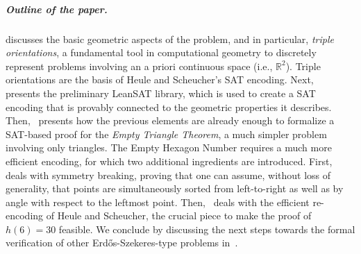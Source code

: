 \subparagraph*{Outline of the paper.}  discusses the basic geometric aspects of the problem, and in particular, \emph{triple orientations}, a fundamental tool in computational geometry to discretely represent problems involving an a priori continuous space (i.e., $\mathbb{R}^2$). Triple orientations are the basis of Heule and Scheucher's SAT encoding.
Next,~ presents the preliminary \textsf{LeanSAT} library, which is used to create a SAT encoding that is provably connected to the geometric properties it describes.
Then,~ presents how the previous elements are already enough to formalize a SAT-based proof for the \emph{Empty Triangle Theorem}, a much simpler problem involving only triangles.
The Empty Hexagon Number requires a much more efficient encoding, for which two additional ingredients are introduced. First,~ deals with symmetry breaking, proving that one can assume, without loss of generality, that points are simultaneously sorted from left-to-right as well as by angle with respect to the leftmost point. 
Then,~ deals with the efficient re-encoding of Heule and Scheucher, the crucial piece to make the proof of $h(6) = 30$ feasible. We conclude by discussing the next steps towards the formal verification of other Erd\H{o}s-Szekeres-type problems in~.
